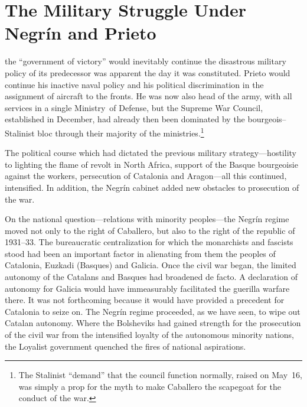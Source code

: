\chapter[Military Struggle Under Negr\'in and Prieto]{The Military Struggle Under \\ Negr\'in and Prieto}

\indexIPrieto{}\indexJNegrin
{} the ``government of victory'' would inevitably continue the disastrous military policy of its predecessor was apparent the day it was constituted. Prieto would continue his inactive naval policy and his political discrimination in the assignment of aircraft to the fronts. He was now also head of the army, with all services in a single Ministry~of Defense, but the Supreme War Council, established in December, had already then been dominated by the bourgeois--Stalinist bloc through their majority of the ministries.\footnote{The Stalinist ``demand'' that the council function normally, raised on May~16, was simply a prop for the myth to make Caballero the scapegoat for the conduct of the war.}

The political course which had dictated the previous military stra\-te\-gy---hostility to lighting the flame of revolt in North Africa, support of the Basque bourgeoisie against the workers, persecution of Catalonia and Aragon---all this continued, intensified. In addition, the Negr\'in cabinet added new obstacles to prosecution of the war.

On the national question---relations with minority peoples---the Negr\'in regime moved not only to the right of Caballero, but also to the right of the republic of 1931--33. The bureaucratic centralization for which the monarchists and fascists stood had been an important factor in alienating from them the peoples of Catalonia, Euzkadi (Basques) and Galicia. Once the civil war began, the limited autonomy of the Catalans and Basques had broadened de facto. A declaration of autonomy for Galicia would have immeasurably facilitated the guerilla warfare there. It was not forthcoming because it would have provided a precedent for Catalonia to seize on. The Negr\'in regime proceeded, as we have seen, to wipe out Catalan autonomy. Where the Bolsheviks had gained strength for the prosecution of the civil war from the intensified loyalty of the autonomous minority nations, the Loyalist government quenched the fires of national aspirations.

